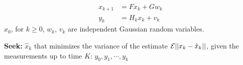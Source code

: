 \documentclass[letterpaper]{article}
\begin{document}

\baselineskip=18pt  %

\setlength{\parskip}{.3in}
\setlength{\itemsep}{.3in}

\pagestyle{plain}
%
%

\Large

\begin{align*}
x_{k+1} &= F x_k + G w_k \\
y_k &= H_k x_k + v_k
\end{align*}
$x_0$, for $k\ge 0$,  $w_k$, $v_k$ are independent Gaussian random variables.

\textbf{Seek:} $\hat{x}_k$ that minimizes the variance of the estimate $ {\cal E} || x_k -\hat{x}_k || $, given the measurements up to time $K$: $y_0, y_1, \cdots, y_k$
\end{document}
